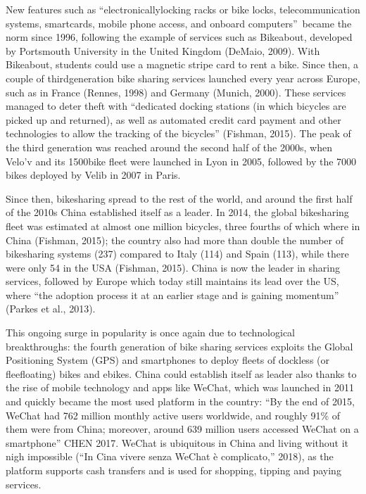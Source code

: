 \documentclass[letterpaper,10pt,english]{jupyterBook}
\begin{document}
\sphinxAtStartPar
New features such as “electronically\sphinxhyphen{}locking racks or bike locks, telecommunication systems, smart\sphinxhyphen{}cards, mobile phone access, and on\sphinxhyphen{}board computers” became the norm since 1996, following the example of services such as Bikeabout, developed by Portsmouth University in the United Kingdom (DeMaio, 2009). With Bikeabout, students could use a magnetic stripe card to rent a bike. Since then, a couple of third\sphinxhyphen{}generation bike sharing services launched every year across Europe, such as in France (Rennes, 1998) and Germany (Munich, 2000). These services managed to deter theft with “dedicated docking stations (in which bicycles are picked up and returned), as well as automated credit card payment and other technologies to allow the tracking of the bicycles” (Fishman, 2015). The peak of the third generation was reached around the second half of the 2000s, when Velo’v and its 1500\sphinxhyphen{}bike fleet were launched in Lyon in 2005, followed by the 7000 bikes deployed by Velib in 2007 in Paris.

\sphinxAtStartPar
Since then, bike\sphinxhyphen{}sharing spread to the rest of the world, and around the first half of the 2010s China established itself as a leader. In 2014, the global bike\sphinxhyphen{}sharing fleet was estimated at almost one million bicycles, three fourths of which where in China (Fishman, 2015); the country also had more than double the number of bike\sphinxhyphen{}sharing systems (237) compared to Italy (114) and Spain (113), while there were only 54 in the USA (Fishman, 2015). China is now the leader in sharing services, followed by Europe \sphinxhyphen{} which today still maintains its lead over the US, where “the adoption process it at an earlier stage and is gaining momentum” (Parkes et al., 2013).

\sphinxAtStartPar
This ongoing surge in popularity is once again due to technological breakthroughs: the fourth generation of bike sharing services exploits the Global Positioning System (GPS) and smartphones to deploy fleets of dock\sphinxhyphen{}less (or flee\sphinxhyphen{}floating) bikes and e\sphinxhyphen{}bikes. China could establish itself as leader also thanks to the rise of mobile technology and apps like WeChat, which was launched in 2011 and quickly became the most used platform in the country: “By the end of 2015, WeChat had 762 million monthly active users worldwide, and roughly 91\% of them were from China; moreover, around 639 million users accessed WeChat on a smartphone” CHEN 2017. WeChat is ubiquitous in China and living without it nigh impossible (“In Cina vivere senza WeChat è complicato,” 2018), as the platform supports cash transfers and is used for shopping, tipping and paying services.
\end{document}
